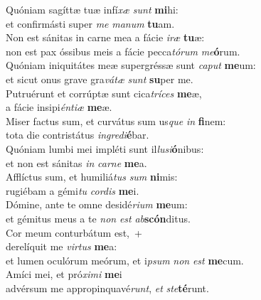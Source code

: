 \evenverse Quóniam sagíttæ tuæ infí\textit{xæ} \textit{sunt} \textbf{mi}hi:~\*\\
\evenverse et confirmásti super \textit{me} \textit{ma}\textit{num} \textbf{tu}am.\\
\oddverse Non est sánitas in carne mea a fácie \textit{i}\textit{ræ} \textbf{tu}æ:~\*\\
\oddverse non est pax óssibus meis a fácie pecca\textit{tó}\textit{rum} \textit{me}\textbf{ó}rum.\\
\evenverse Quóniam iniquitátes meæ supergréssæ sunt \textit{ca}\textit{put} \textbf{me}um:~\*\\
\evenverse et sicut onus grave gra\textit{vá}\textit{tæ} \textit{sunt} \textbf{su}per me.\\
\oddverse Putruérunt et corrúptæ sunt cica\textit{trí}\textit{ces} \textbf{me}æ,~\*\\
\oddverse a fácie insipi\textit{én}\textit{ti}\textit{æ} \textbf{me}æ.\\
\evenverse Miser factus sum, et curvátus sum us\textit{que} \textit{in} \textbf{fi}nem:~\*\\
\evenverse tota die contristátus \textit{in}\textit{gre}\textit{di}\textbf{é}bar.\\
\oddverse Quóniam lumbi mei impléti sunt il\textit{lu}\textit{si}\textbf{ó}nibus:~\*\\
\oddverse et non est sánitas \textit{in} \textit{car}\textit{ne} \textbf{me}a.\\
\evenverse Afflíctus sum, et humiliá\textit{tus} \textit{sum} \textbf{ni}mis:~\*\\
\evenverse rugiébam a gémi\textit{tu} \textit{cor}\textit{dis} \textbf{me}i.\\
\oddverse Dómine, ante te omne desidé\textit{ri}\textit{um} \textbf{me}um:~\*\\
\oddverse et gémitus meus a te \textit{non} \textit{est} \textit{ab}\textbf{scón}ditus.\\
\evenverse Cor meum conturbátum est,~+\\
\evenverse  derelíquit me \textit{vir}\textit{tus} \textbf{me}a:~\*\\
\evenverse et lumen oculórum meórum, et i\textit{psum} \textit{non} \textit{est} \textbf{me}cum.\\
\oddverse Amíci mei, et pró\textit{xi}\textit{mi} \textbf{me}i~\*\\
\oddverse advérsum me appropinquavé\textit{runt}, \textit{et} \textit{ste}\textbf{té}runt.\\
